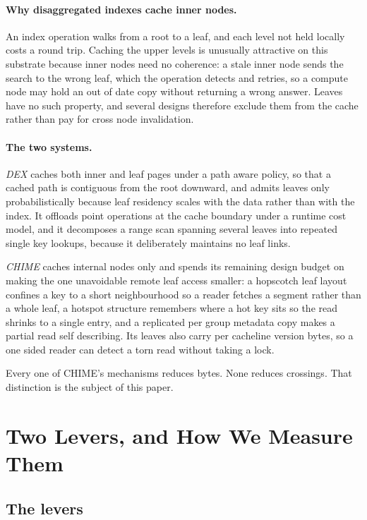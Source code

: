 \documentclass[sigconf,nonacm]{acmart}
\begin{document}
\paragraph{Why disaggregated indexes cache inner nodes.}
An index operation walks from a root to a leaf, and each level not held locally
costs a round trip. Caching the upper levels is unusually attractive on this
substrate because inner nodes need no coherence: a stale inner node sends the
search to the wrong leaf, which the operation detects and retries, so a compute
node may hold an out of date copy without returning a wrong answer. Leaves have
no such property, and several designs therefore exclude them from the cache
rather than pay for cross node invalidation.

\paragraph{The two systems.}
\emph{DEX} caches both inner and leaf pages under a path aware policy, so that a
cached path is contiguous from the root downward, and admits leaves only
probabilistically because leaf residency scales with the data rather than with
the index. It offloads point operations at the cache boundary under a runtime cost
model, and it decomposes a range scan spanning several leaves into repeated single
key lookups, because it deliberately maintains no leaf links.

\emph{CHIME} caches internal nodes only and spends its remaining design budget on
making the one unavoidable remote leaf access smaller: a hopscotch leaf layout
confines a key to a short neighbourhood so a reader fetches a segment rather than
a whole leaf, a hotspot structure remembers where a hot key sits so the read
shrinks to a single entry, and a replicated per group metadata copy makes a
partial read self describing. Its leaves also carry per cacheline version bytes,
so a one sided reader can detect a torn read without taking a lock.

Every one of CHIME's mechanisms reduces bytes. None reduces crossings. That
distinction is the subject of this paper.

\section{Two Levers, and How We Measure Them}
\label{sec:method}

\subsection{The levers}
\end{document}
